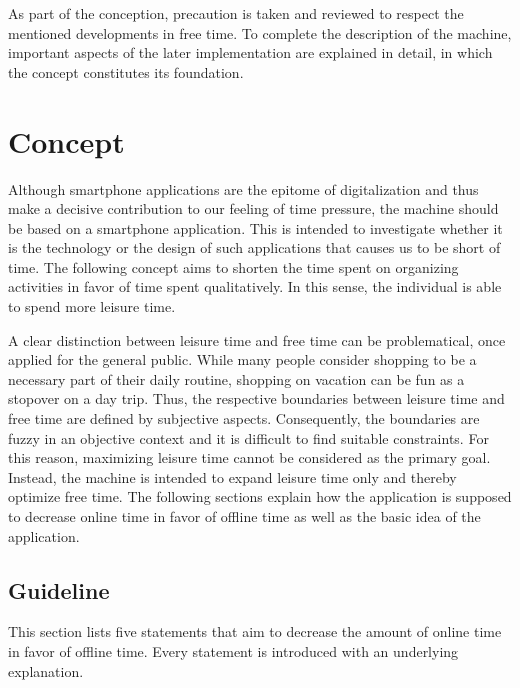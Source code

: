 \documentclass[12pt,numbers=noenddot,parskip,bibliography=totocnumbered,listof=totocnumbered,draft]{scrreprt}
\begin{document}
As part of the conception, precaution is taken and reviewed to respect the mentioned developments in free time. To complete the description of the machine, important aspects of the later implementation are explained in detail, in which the concept constitutes its foundation.

\section{Concept}
Although smartphone applications are the epitome of digitalization and thus make a decisive contribution to our feeling of time pressure, the machine should be based on a smartphone application. This is intended to investigate whether it is the technology or the design of such applications that causes us to be short of time. The following concept aims to shorten the time spent on organizing activities in favor of time spent qualitatively. In this sense, the individual is able to spend more leisure time.

A clear distinction between leisure time and free time can be problematical, once applied for the general public. While many people consider shopping to be a necessary part of their daily routine, shopping on vacation can be fun as a stopover on a day trip. Thus, the respective boundaries between leisure time and free time are defined by subjective aspects. Consequently, the boundaries are fuzzy in an objective context and it is difficult to find suitable constraints. For this reason, maximizing leisure time cannot be considered as the primary goal. Instead, the machine is intended to expand leisure time only and thereby optimize free time. The following sections explain how the application is supposed to decrease online time in favor of offline time as well as the basic idea of the application.

\subsection{Guideline}
This section lists five statements that aim to decrease the amount of online time in favor of offline time. Every statement is introduced with an underlying explanation.
\end{document}
